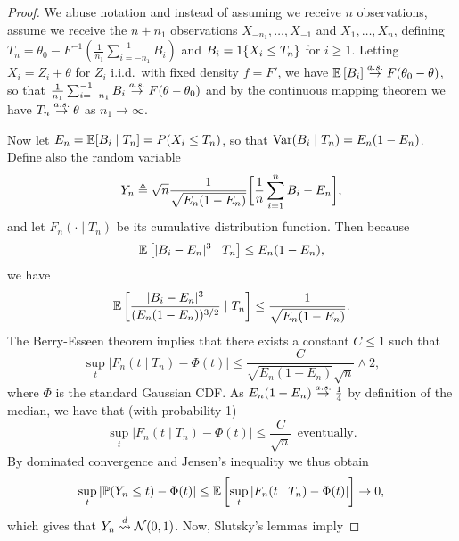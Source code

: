 \begin{proof}
  We abuse notation and instead of assuming we receive $n$ observations, assume
  we receive the $n + n_1$ observations $X_{-n_1}, \ldots, X_{-1}$ and
  $X_1, \ldots, X_n$, defining $T_n = \theta_0 - F^{-1}(\frac{1}{n_1}
  \sum_{i = -n_1}^{-1} B_i)$ and
  $B_i = 1\!\left\{X_i \le T_n\right\}$ for $i \ge 1$.
  Letting $X_i = Z_i + \theta$ for $Z_i$ i.i.d.\ with fixed density
  $f = F'$, we have
  $\mathbb{E}\left[ B_i\right] \stackrel{a.s.}{\rightarrow} F(\theta_0 - \theta)$, so that
  $\frac{1}{n_1} \sum_{i = -n_1}^{-1} B_i \stackrel{a.s.}{\rightarrow} F(\theta - \theta_0)$ and
  by the continuous
  mapping theorem we have $T_n \stackrel{a.s.}{\rightarrow} \theta$ as $n_1 \to \infty$.

  Now let
  $E_n = \mathbb{E}[B_i \mid T_n] = P(X_i \le T_n)$,
  so that $\textup{Var}(B_i \mid T_n) = E_n(1 - E_n)$. Define also the random
  variable
  \begin{equation*}
    Y_n \triangleq \sqrt{n}
    \frac{1}{\sqrt{E_n (1 - E_n)}}
    \bigg[\frac{1}{n}\sum_{i = 1}^n B_i - E_n\bigg],
  \end{equation*}
  and let $F_n(\cdot \mid T_n)$ be its cumulative distribution function.
  Then because
  \begin{equation*}
    \mathbb{E}\left[|B_i - E_n|^3 \mid T_n\right] \le E_n(1 - E_n),
    \end{equation*}
      we have 
\begin{equation*}
    \mathbb{E}\left[\frac{|B_i - E_n|^3}{(E_n(1 - E_n))^{3/2}} \mid T_n\right]
    \le \frac{1}{\sqrt{E_n(1 - E_n)}}.
  \end{equation*}
 The Berry-Esseen theorem implies that there exists a constant
  $C \le 1$ such that
  \begin{equation*}
    \sup_t \left|F_n(t \mid T_n) - \Phi(t) \right|
    \le \frac{C}{\sqrt{E_n (1 - E_n)} \sqrt{n}} \wedge 2,
  \end{equation*}
  where $\Phi$ is the standard Gaussian CDF.
  As $E_n (1 - E_n) \stackrel{a.s.}{\rightarrow} \frac{1}{4}$ by definition of the median,
  we have
  that (with probability 1)
  \begin{equation*}
    \sup_t \left|F_n(t \mid T_n) - \Phi(t)\right| \le \frac{C}{\sqrt{n}}
    ~~ \mbox{eventually}.
  \end{equation*}
  By dominated convergence and Jensen's inequality we thus obtain
  \begin{equation*}
    \sup_t \left|\mathbb{P}(Y_n \le t) - \Phi(t)\right|
    \le \mathbb{E}\left[
      \sup_t \left|F_n(t \mid T_n) - \Phi(t)\right| \right]
    \to 0,
  \end{equation*}
  which gives that $Y_n \stackrel{d}{\rightsquigarrow} \mathcal{N}(0, 1)$. Now, Slutsky's lemmas imply

\end{proof}
